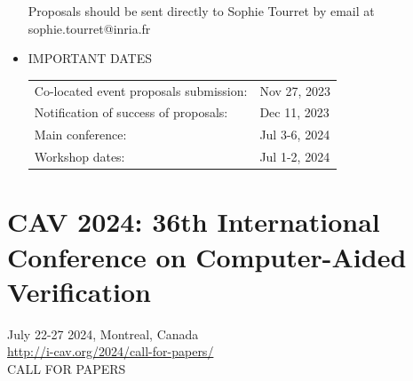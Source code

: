 \documentclass[prodmode,acmtecs]{acmsmall} %
\begin{document}
\begin{itemize}
  Proposals should be sent directly to Sophie Tourret by email at sophie.tourret@inria.fr 
 
\item  IMPORTANT DATES 
 
\begin{tabulary}{\linewidth}{LL}Co-located event proposals submission:  & Nov 27, 2023 \\
Notification of success of proposals:  & Dec 11, 2023 \\
Main conference:  & Jul 3-6, 2024 \\
Workshop dates:  & Jul 1-2, 2024 \\
\end{tabulary}
 
\end{itemize}\section{CAV 2024: 36th International Conference on Computer-Aided Verification}\label{CAV2024}  July 22-27 2024, Montreal, Canada\\ 
  \href{http://i-cav.org/2024/call-for-papers/}{http://i-cav.org/2024/call-for-papers/}\\ 
CALL FOR PAPERS 
\end{document}
